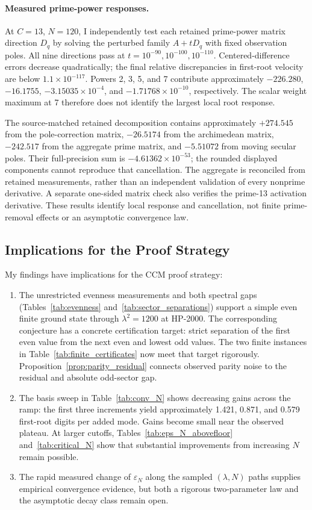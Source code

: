 \documentclass[11pt,a4paper]{article}
\begin{document}
\paragraph{Measured prime-power responses.}
At $C=13$, $N=120$, I independently test each retained prime-power
matrix direction $D_q$ by solving the perturbed family $A+tD_q$ with
fixed observation poles. All nine directions pass at
$t=10^{-90},10^{-100},10^{-110}$. Centered-difference errors decrease
quadratically; the final relative discrepancies in first-root velocity
are below $1.1\times10^{-117}$. Powers 2, 3, 5, and 7 contribute
approximately $-226.280$, $-16.1755$, $-3.15035\times10^{-4}$, and
$-1.71768\times10^{-10}$, respectively. The scalar weight maximum
at 7 therefore does not identify the largest local root response.

The source-matched retained decomposition contains approximately
$+274.545$ from the pole-correction matrix, $-26.5174$ from the
archimedean matrix, $-242.517$ from the aggregate prime matrix,
and $-5.51072$ from moving secular poles. Their full-precision sum is
$-4.61362\times10^{-53}$; the rounded displayed components cannot
reproduce that cancellation. The aggregate is reconciled from
retained measurements, rather than an independent validation of
every nonprime derivative. A separate one-sided matrix check also
verifies the prime-13 activation derivative. These results identify
local response and cancellation, not finite prime-removal effects
or an asymptotic convergence law.

\subsection{Implications for the Proof Strategy}

My findings have implications for the CCM proof strategy:
\begin{enumerate}
\item The unrestricted evenness measurements and both spectral gaps
(Tables~\ref{tab:evenness} and~\ref{tab:sector_separations}) support a
simple even finite ground state through $\lambda^2=1200$ at HP-2000.
The corresponding conjecture has a concrete certification target:
strict separation of the first even value from the next even and
lowest odd values. The two finite instances in
Table~\ref{tab:finite_certificates} now meet that target rigorously.
Proposition~\ref{prop:parity_residual} connects
observed parity noise to the residual and absolute odd-sector gap.
\item The basis sweep in Table~\ref{tab:conv_N} shows decreasing
gains across the ramp: the first three increments yield approximately
1.421, 0.871, and 0.579 first-root digits per added mode. Gains become
small near the observed plateau. At larger cutoffs,
Tables~\ref{tab:eps_N_abovefloor} and~\ref{tab:critical_N} show that
substantial improvements from increasing $N$ remain possible.
\item The rapid measured change of $\varepsilon_N$ along the sampled
$(\lambda,N)$ paths supplies empirical convergence evidence, but both a
rigorous two-parameter law and the asymptotic decay class remain open.
\end{enumerate}
\end{document}
